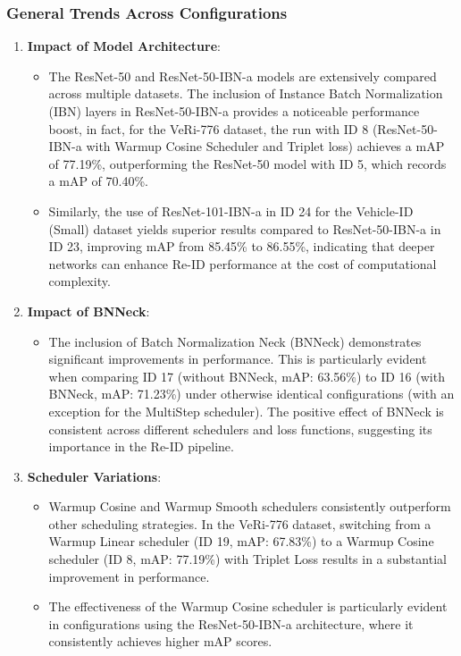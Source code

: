 \subsubsection{General Trends Across Configurations}
\begin{enumerate}
    \item \textbf{Impact of Model Architecture}:
    \begin{itemize}
        \item The ResNet-50 and ResNet-50-IBN-a models are extensively compared across multiple datasets. The inclusion of Instance Batch Normalization (IBN) layers in ResNet-50-IBN-a provides a noticeable performance boost, in fact, for the VeRi-776 dataset, the run with ID 8 (ResNet-50-IBN-a with Warmup Cosine Scheduler and Triplet loss) achieves a mAP of 77.19\%, outperforming the ResNet-50 model with ID 5, which records a mAP of 70.40\%.
        \item Similarly, the use of ResNet-101-IBN-a in ID 24 for the Vehicle-ID (Small) dataset yields superior results compared to ResNet-50-IBN-a in ID 23, improving mAP from 85.45\% to 86.55\%, indicating that deeper networks can enhance Re-ID performance at the cost of computational complexity.
    \end{itemize}
    
    \item \textbf{Impact of BNNeck}:
    \begin{itemize}
        \item The inclusion of Batch Normalization Neck (BNNeck) demonstrates significant improvements in performance. This is particularly evident when comparing ID 17 (without BNNeck, mAP: 63.56\%) to ID 16 (with BNNeck, mAP: 71.23\%) under otherwise identical configurations (with an exception for the MultiStep scheduler). The positive effect of BNNeck is consistent across different schedulers and loss functions, suggesting its importance in the Re-ID pipeline.
    \end{itemize}
    
    \item \textbf{Scheduler Variations}:
    \begin{itemize}
        \item Warmup Cosine and Warmup Smooth schedulers consistently outperform other scheduling strategies. In the VeRi-776 dataset, switching from a Warmup Linear scheduler (ID 19, mAP: 67.83\%) to a Warmup Cosine scheduler (ID 8, mAP: 77.19\%) with Triplet Loss results in a substantial improvement in performance.
        \item The effectiveness of the Warmup Cosine scheduler is particularly evident in configurations using the ResNet-50-IBN-a architecture, where it consistently achieves higher mAP scores.
    \end{itemize}
\end{enumerate}

